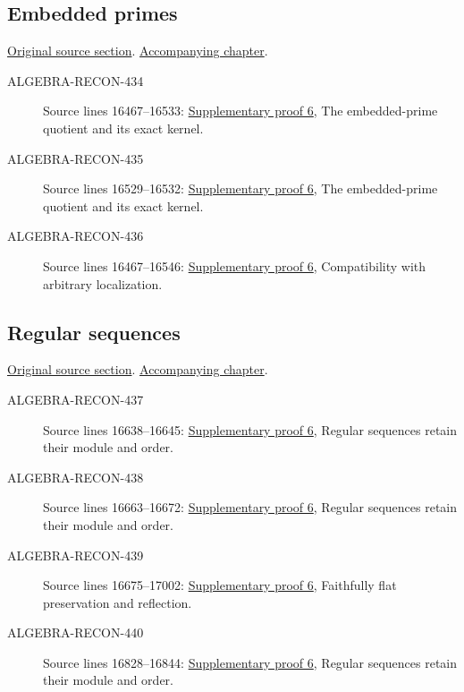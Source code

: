\subsection{Embedded primes}
\hypertarget{algebra-source-section-embedded-primes}{}
\noindent\href{https://github.com/stacks/stacks-project/blob/a04446e57ec1fbc252a871afcec7752fb2807b14/algebra.tex\#L16445}{Original source section}. \href{algebra.pdf\#nameddest=section-embedded-primes}{Accompanying chapter}.

\begin{description}
\item[ALGEBRA-RECON-434] Source lines 16467--16533: \hyperlink{algebra_embedded_regular_notes_20260927}{Supplementary proof 6}, The embedded-prime quotient and its exact kernel.
\item[ALGEBRA-RECON-435] Source lines 16529--16532: \hyperlink{algebra_embedded_regular_notes_20260927}{Supplementary proof 6}, The embedded-prime quotient and its exact kernel.
\item[ALGEBRA-RECON-436] Source lines 16467--16546: \hyperlink{algebra_embedded_regular_notes_20260927}{Supplementary proof 6}, Compatibility with arbitrary localization.
\end{description}

\subsection{Regular sequences}
\hypertarget{algebra-source-section-regular-sequences}{}
\noindent\href{https://github.com/stacks/stacks-project/blob/a04446e57ec1fbc252a871afcec7752fb2807b14/algebra.tex\#L16587}{Original source section}. \href{algebra.pdf\#nameddest=section-regular-sequences}{Accompanying chapter}.

\begin{description}
\item[ALGEBRA-RECON-437] Source lines 16638--16645: \hyperlink{algebra_embedded_regular_notes_20260927}{Supplementary proof 6}, Regular sequences retain their module and order.
\item[ALGEBRA-RECON-438] Source lines 16663--16672: \hyperlink{algebra_embedded_regular_notes_20260927}{Supplementary proof 6}, Regular sequences retain their module and order.
\item[ALGEBRA-RECON-439] Source lines 16675--17002: \hyperlink{algebra_embedded_regular_notes_20260927}{Supplementary proof 6}, Faithfully flat preservation and reflection.
\item[ALGEBRA-RECON-440] Source lines 16828--16844: \hyperlink{algebra_embedded_regular_notes_20260927}{Supplementary proof 6}, Regular sequences retain their module and order.
\end{description}

